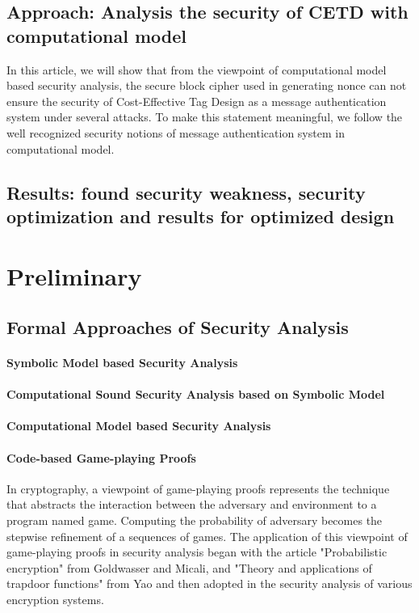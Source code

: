 \documentclass{article}
\begin{document}
\subsection{Approach: Analysis the security of CETD with computational model}
In this article, we will show that from the viewpoint of computational model based security analysis, the secure block cipher used in generating nonce can not ensure the security of Cost-Effective Tag Design as a message authentication system under several attacks. To make this statement meaningful, we follow the well recognized security notions of message authentication system in computational model.
\subsection{Results: found security weakness, security optimization and results for optimized design }

\section{Preliminary}
\subsection{Formal Approaches of Security Analysis}
\paragraph{Symbolic Model based Security Analysis}
\paragraph{Computational Sound Security Analysis based on Symbolic Model}
\paragraph{Computational Model based Security Analysis}

\paragraph{Code-based Game-playing Proofs}
In cryptography, a viewpoint of game-playing proofs represents the technique that abstracts the interaction between the adversary and environment to a program named game. Computing the probability of adversary becomes the stepwise refinement of a sequences of games. 
The application of this viewpoint of game-playing proofs in security analysis began with the article "Probabilistic encryption" from Goldwasser and Micali\cite{keylist}, and "Theory and applications of trapdoor functions" from Yao \cite{keylist}and then adopted in the security analysis of various encryption systems\cite{keylist}.  
\end{document}

